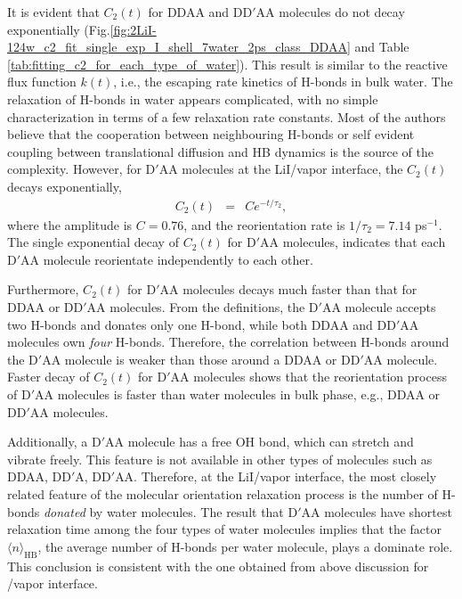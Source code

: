 It is evident that $C_2(t)$ for DDAA and DD$'$AA molecules do not decay exponentially (Fig.\thinspace\ref{fig:2LiI-124w_c2_fit_single_exp_I_shell_7water_2ps_class_DDAA} 
and Table \ref{tab:fitting_c2_for_each_type_of_water}).
This result is similar to the reactive flux function $k(t)$, i.e., 
the escaping rate kinetics of H-bonds in bulk water.
The relaxation of H-bonds in water appears complicated, with no simple characterization in terms of a few relaxation rate constants. 
Most of the authors believe that the cooperation between neighbouring H-bonds\cite{Sciortino1989, Ohmine1995} or 
self evident coupling between translational diffusion and HB dynamics is the source of the complexity. 
However, for D$'$AA molecules at the LiI/vapor interface,
the $C_2(t)$ decays exponentially,
\begin{eqnarray}
  C_2(t) &=& C e^{-t/{\tau_2}},\nonumber
\end{eqnarray}
where the amplitude is $C=0.76$, and the reorientation rate is $1/\tau_2 = 7.14$ ps$^{-1}$.
The single exponential decay of $C_2(t)$ for D$'$AA molecules, indicates that each D$'$AA  molecule reorientate independently to each other. 

Furthermore, $C_2(t)$ for D$'$AA molecules decays much faster than that for DDAA or DD$'$AA molecules.
From the definitions, the D$'$AA molecule accepts two H-bonds and donates only one H-bond, 
while both DDAA and DD$'$AA molecules own \emph{four} H-bonds.
Therefore, the correlation between H-bonds around the D$'$AA molecule is weaker than those around a DDAA or DD$'$AA molecule. 
Faster decay of $C_2(t)$ for D$'$AA molecules shows that the reorientation process of D$'$AA
molecules is faster than water molecules in bulk phase, e.g., DDAA or DD$'$AA molecules.

Additionally, a D$'$AA molecule has a free OH bond, which can stretch and vibrate freely. 
This feature is not available in other types of molecules such as DDAA, DD$'$A, DD$'$AA. 
Therefore, at the LiI/vapor interface, the most closely related feature of the molecular orientation relaxation process is 
the number of H-bonds \emph{donated} by water molecules. 
The result that D$'$AA molecules have shortest relaxation time among the four types of water molecules 
implies that the factor $\langle n\rangle_\text{HB}$, the average number of H-bonds per water molecule, plays a dominate role. 
This conclusion is consistent with the one obtained from above discussion for \LiN/vapor interface.

